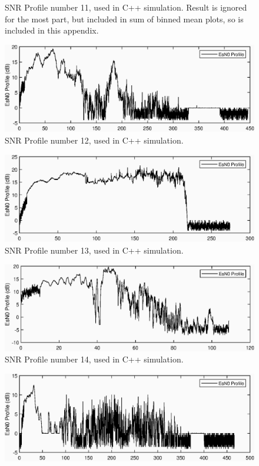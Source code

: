 \begin{appendices}
\begin{figure}[ht!]
\caption{SNR Profile number 11, used in C++ simulation. Result is ignored for the most part, but included in sum of binned mean plots, so is included in this appendix.}
\end{figure}
\begin{figure}[ht!]
\includegraphics{figures/c_sim_snr/EsNo_profile_12.eps}
\caption{SNR Profile number 12, used in C++ simulation.}
\end{figure}
\begin{figure}[ht!]
\includegraphics{figures/c_sim_snr/EsNo_profile_13.eps}
\caption{SNR Profile number 13, used in C++ simulation.}
\end{figure}
\begin{figure}[ht!]
\includegraphics{figures/c_sim_snr/EsNo_profile_14.eps}
\caption{SNR Profile number 14, used in C++ simulation.}
\end{figure}
\begin{figure}[ht!]
\includegraphics{figures/c_sim_snr/EsNo_profile_15.eps}

\end{figure}
\end{appendices}
